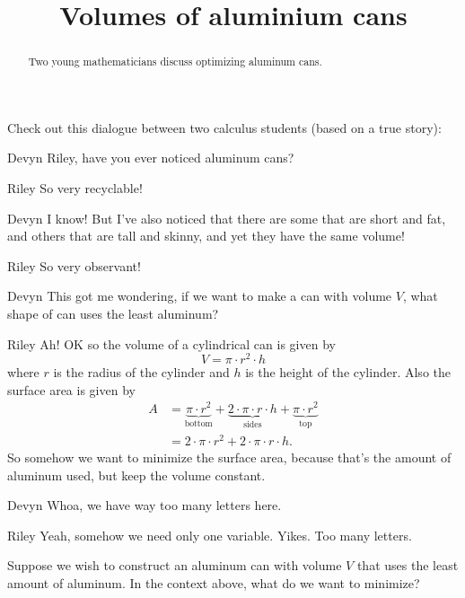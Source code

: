 \documentclass{ximera}
\title[Break-Ground:]{Volumes of aluminium cans}
\begin{document}
\begin{abstract}
Two young mathematicians discuss optimizing aluminum cans.
\end{abstract}
\maketitle

Check out this dialogue between two calculus students (based on a true
story):

\begin{dialogue}
\item[Devyn] Riley, have you ever noticed aluminum cans?
\item[Riley] So very recyclable! 
\item[Devyn] I know! But I've also noticed that there are some that
  are short and fat, and others that are tall and skinny, and yet they
  have the same volume!
\item[Riley] So very observant! 
\item[Devyn] This got me wondering, if we want to make a can with
  volume $V$, what shape of can uses the least aluminum?
\item[Riley] Ah! OK so the volume of a cylindrical can is given by
  \[
  V = \pi \cdot r^2 \cdot h
  \]
  where $r$ is the radius of the cylinder and $h$ is the height of the
  cylinder. Also the surface area is given by
  \begin{align*}
    A &= \underbrace{\pi \cdot r^2}_{\text{bottom}} + \underbrace{2\cdot\pi \cdot r\cdot h}_{\text{sides}} + \underbrace{\pi \cdot r^2}_{\text{top}}\\
    &= 2\cdot \pi \cdot r^2 + 2\cdot\pi \cdot r\cdot h.    
  \end{align*}
  So somehow we want to minimize the surface area, because that's the
  amount of aluminum used, but keep the volume constant.
\item[Devyn] Whoa, we have way too many letters here.
\item[Riley] Yeah, somehow we need only one variable. Yikes. Too many letters.
\end{dialogue}

\begin{problem}
  Suppose we wish to construct an aluminum can with volume $V$ that
  uses the least amount of aluminum. In the context above, what do we
  want to minimize?
  \begin{multipleChoice}
  \end{multipleChoice}
\end{problem}
\end{document}
